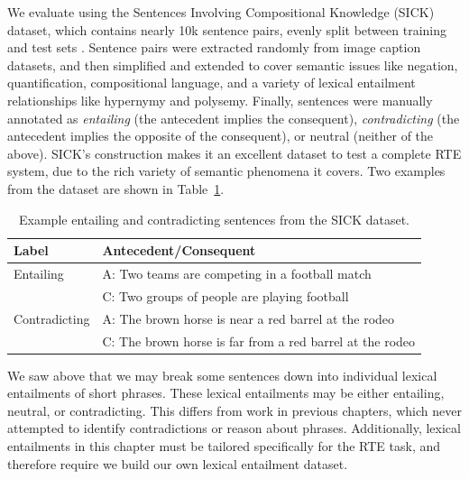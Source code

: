 We evaluate using the Sentences Involving Compositional Knowledge (SICK)
dataset, which contains nearly 10k sentence pairs, evenly split between
training and test sets \cite{marelli:2014:semeval}. Sentence pairs were
extracted randomly from image caption datasets, and then simplified and extended to
cover semantic issues like negation, quantification, compositional language,
and a variety of lexical entailment relationships like hypernymy and polysemy.
Finally, sentences were manually annotated as {\em entailing} (the antecedent
implies the consequent), {\em contradicting} (the antecedent implies the
opposite of the consequent), or neutral (neither of the above). SICK's
construction makes it an excellent dataset to test a complete RTE system, due
to the rich variety of semantic phenomena it covers. Two examples from the
dataset are shown in Table~\ref{tab:sickexample}.

\begin{table}
  \centering
  \begin{tabular}{|ll|}
    \hline
    {\bf Label} & {\bf Antecedent/Consequent}\\
    \hline
    Entailing & A: Two teams are competing in a football match\\
    & C: Two groups of people are playing football\\
    \hline
    Contradicting & A: The brown horse is near a red barrel at the rodeo\\
    & C: The brown horse is far from a red barrel at the rodeo\\
    \hline
  \end{tabular}
  \caption{Example entailing and contradicting sentences from the SICK dataset.}
  \label{tab:sickexample}
\end{table}

We saw above that we may break some sentences down into
individual lexical entailments of short phrases. These lexical
entailments may be either entailing, neutral, or contradicting. This differs
from work in previous chapters, which never attempted to identify contradictions
or reason about phrases. Additionally, lexical entailments in this chapter must
be tailored specifically for the RTE task, and therefore require we build
our own lexical entailment dataset.

